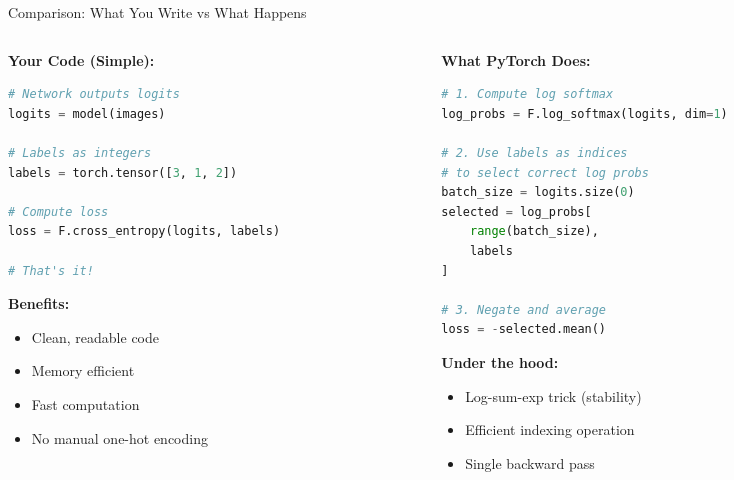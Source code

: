 \documentclass[xcolor=svgnames, 8pt, handout, standalone]{beamer}
\newcommand{\1}{\mathbf{1}}
\begin{document}
\begin{frame}[fragile]{Comparison: What You Write vs What Happens}
\begin{columns}
\begin{column}{0.48\textwidth}
\textbf{Your Code (Simple):}
\begin{lstlisting}[language=Python]
# Network outputs logits
logits = model(images)

# Labels as integers
labels = torch.tensor([3, 1, 2])

# Compute loss
loss = F.cross_entropy(logits, labels)

# That's it!
\end{lstlisting}

\vspace{0.5em}
\textbf{Benefits:}
\begin{itemize}
\item Clean, readable code
\item Memory efficient
\item Fast computation
\item No manual one-hot encoding
\end{itemize}
\end{column}
\begin{column}{0.48\textwidth}
\textbf{What PyTorch Does:}
\begin{lstlisting}[language=Python]
# 1. Compute log softmax
log_probs = F.log_softmax(logits, dim=1)

# 2. Use labels as indices
# to select correct log probs
batch_size = logits.size(0)
selected = log_probs[
    range(batch_size), 
    labels
]

# 3. Negate and average
loss = -selected.mean()
\end{lstlisting}

\vspace{0.5em}
\textbf{Under the hood:}
\begin{itemize}
\item Log-sum-exp trick (stability)
\item Efficient indexing operation
\item Single backward pass
\end{itemize}
\end{column}
\end{columns}
\end{frame}
\end{document}
